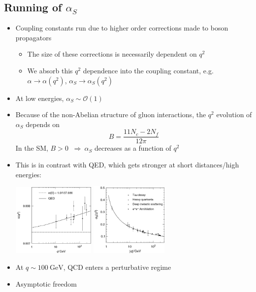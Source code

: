 \documentclass[11pt]{article}
\newcommand{\gev}{\text{GeV}}
\newcommand{\ord}[1]{\ensuremath{\mathcal{O}(#1)}}
\newcommand{\thus}{\ensuremath{~\Rightarrow~}}
\begin{document}
\subsection{Running of $\alpha_S$}
\begin{itemize}
  \item Coupling constants run due to higher order corrections made to boson propagators
  \begin{itemize}
    \item The size of these corrections is necessarily dependent on $q^2$
    \item We absorb this $q^2$ dependence into the coupling constant, e.g. $\alpha\rightarrow\alpha(q^2)$, $\alpha_S\rightarrow \alpha_S(q^2)$
  \end{itemize}
  \item At low energies, $\alpha_S \sim \ord1$
  \item Because of the non-Abelian structure of gluon interactions, the $q^2$ evolution of $\alpha_S$ depends on 
  \begin{equation}
    B = \frac{11N_c-2N_f}{12\pi}
  \end{equation}
  In the SM, $B>0$ \thus $\alpha_S$ decreases as a function of $q^2$
  \item This is in contrast with QED, which gets stronger at short distances/high energies:
  \begin{center}
    \includegraphics[width=0.32\textwidth]{figs/alpharun.png}\hspace{5mm}
    \includegraphics[width=0.3\textwidth]{figs/alphaSrun.png}
  \end{center}
  \item At $q\sim 100~\gev$, QCD enters a perturbative regime
  \item Asymptotic freedom

\end{itemize}
\end{document}
